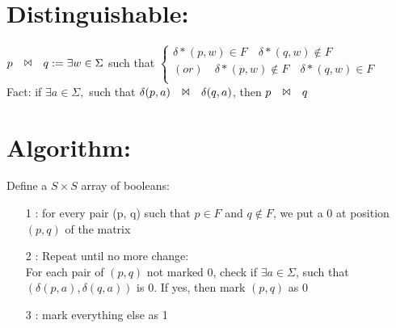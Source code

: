 \documentclass [9 pt]{article}
\theoremstyle{definition}
\begin{document}
\section*{Distinguishable:}
$ p\quad \Bowtie \quad q := \exists w \in \Sigma $ such that $\begin{cases}
	\delta*(p, w) \in F \quad \delta*(q, w) \notin F \\
	(or) \quad  \delta*(p, w) \notin F \quad \delta*(q, w) \in F\\
\end{cases}$
\\Fact: if $\exists a \in \Sigma, $ such that $\delta(p, a)\quad \Bowtie \quad \delta(q, a)$, then $ p\quad \Bowtie \quad q $
\section*{Algorithm:}
Define a $S \times S$ array of booleans:
\begin{itemize}
	\item[1]: for every pair (p, q) such that $p \in F $ and $q \notin F$, we put a 0 at position $(p, q)$ of the matrix
	\item[2]: Repeat until no more change:\\
	For each pair of $(p, q)$ not marked 0, check if $\exists a \in \Sigma$, such that $(\delta(p, a),\delta(q, a) ) $ is 0. If yes, then mark $(p, q)$ as 0
	\item[3]: mark everything else as 1\\
\end{itemize}
\end{document}
